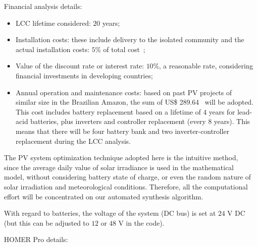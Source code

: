 Financial analysis details:
\begin{itemize}
	\item LCC lifetime considered: $20$ years;
	\item Installation costs: these include delivery to the isolated community and the actual installation costs: $5$\% of total cost~\cite{Agrener2013};
	\item Value of the discount rate or interest rate: $10$\%, a reasonable rate, considering financial investments in developing countries;
	\item Annual operation and maintenance costs: based on past PV projects of similar size in the Brazilian Amazon, the sum of US\$ 289.64~\cite{Agrener2013} will be adopted. This cost includes battery replacement based on a lifetime of $4$ years for lead-acid batteries, plus inverters and controller replacement (every $8$ years). This means that there will be four battery bank and two inverter-controller replacement during the LCC analysis.
\end{itemize}

The PV system optimization technique adopted here is the intuitive method, since the average daily value of solar irradiance is used in the mathematical model, without considering battery state of charge, or even the random nature of solar irradiation and meteorological conditions. Therefore, all the computational effort will be concentrated on our automated synthesis algorithm.

With regard to batteries, the voltage of the system (DC bus) is set at $24$ V DC (but this can be adjusted to $12$ or $48$ V in the code).

HOMER Pro details:

